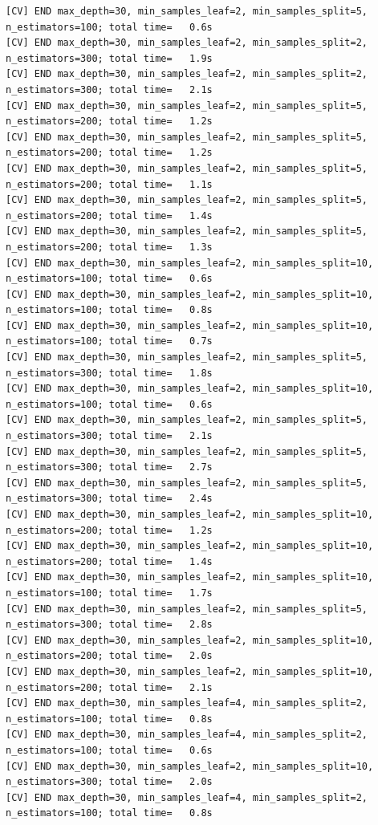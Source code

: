 \documentclass[
  11pt,
  letterpaper,
  DIV=11,
  numbers=noendperiod]{scrartcl}
\begin{document}
\begin{verbatim}
[CV] END max_depth=30, min_samples_leaf=2, min_samples_split=5, n_estimators=100; total time=   0.6s
[CV] END max_depth=30, min_samples_leaf=2, min_samples_split=2, n_estimators=300; total time=   1.9s
[CV] END max_depth=30, min_samples_leaf=2, min_samples_split=2, n_estimators=300; total time=   2.1s
[CV] END max_depth=30, min_samples_leaf=2, min_samples_split=5, n_estimators=200; total time=   1.2s
[CV] END max_depth=30, min_samples_leaf=2, min_samples_split=5, n_estimators=200; total time=   1.2s
[CV] END max_depth=30, min_samples_leaf=2, min_samples_split=5, n_estimators=200; total time=   1.1s
[CV] END max_depth=30, min_samples_leaf=2, min_samples_split=5, n_estimators=200; total time=   1.4s
[CV] END max_depth=30, min_samples_leaf=2, min_samples_split=5, n_estimators=200; total time=   1.3s
[CV] END max_depth=30, min_samples_leaf=2, min_samples_split=10, n_estimators=100; total time=   0.6s
[CV] END max_depth=30, min_samples_leaf=2, min_samples_split=10, n_estimators=100; total time=   0.8s
[CV] END max_depth=30, min_samples_leaf=2, min_samples_split=10, n_estimators=100; total time=   0.7s
[CV] END max_depth=30, min_samples_leaf=2, min_samples_split=5, n_estimators=300; total time=   1.8s
[CV] END max_depth=30, min_samples_leaf=2, min_samples_split=10, n_estimators=100; total time=   0.6s
[CV] END max_depth=30, min_samples_leaf=2, min_samples_split=5, n_estimators=300; total time=   2.1s
[CV] END max_depth=30, min_samples_leaf=2, min_samples_split=5, n_estimators=300; total time=   2.7s
[CV] END max_depth=30, min_samples_leaf=2, min_samples_split=5, n_estimators=300; total time=   2.4s
[CV] END max_depth=30, min_samples_leaf=2, min_samples_split=10, n_estimators=200; total time=   1.2s
[CV] END max_depth=30, min_samples_leaf=2, min_samples_split=10, n_estimators=200; total time=   1.4s
[CV] END max_depth=30, min_samples_leaf=2, min_samples_split=10, n_estimators=100; total time=   1.7s
[CV] END max_depth=30, min_samples_leaf=2, min_samples_split=5, n_estimators=300; total time=   2.8s
[CV] END max_depth=30, min_samples_leaf=2, min_samples_split=10, n_estimators=200; total time=   2.0s
[CV] END max_depth=30, min_samples_leaf=2, min_samples_split=10, n_estimators=200; total time=   2.1s
[CV] END max_depth=30, min_samples_leaf=4, min_samples_split=2, n_estimators=100; total time=   0.8s
[CV] END max_depth=30, min_samples_leaf=4, min_samples_split=2, n_estimators=100; total time=   0.6s
[CV] END max_depth=30, min_samples_leaf=2, min_samples_split=10, n_estimators=300; total time=   2.0s
[CV] END max_depth=30, min_samples_leaf=4, min_samples_split=2, n_estimators=100; total time=   0.8s

\end{verbatim}
\end{document}
